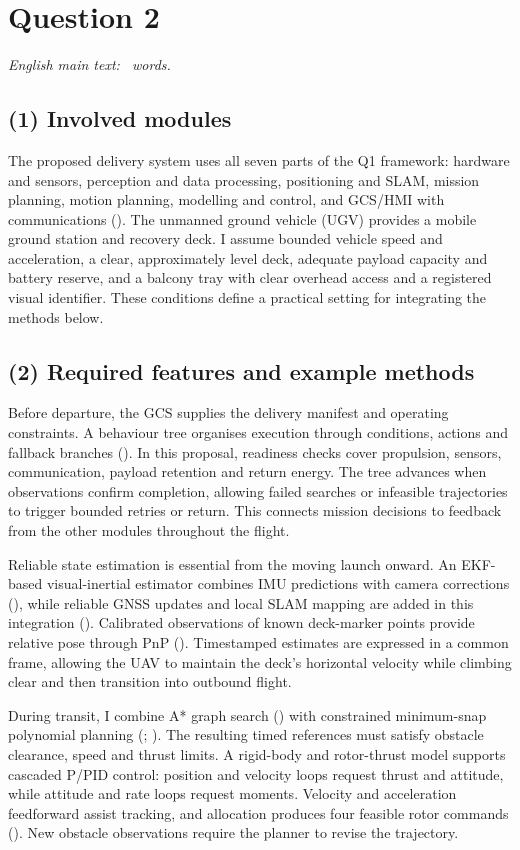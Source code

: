 \section*{Question 2}
\noindent\textit{English main text: \QtwoWords\ words.}
\subsection*{(1) Involved modules}
The proposed delivery system uses all seven parts of the Q1 framework: hardware and sensors, perception and data processing, positioning and SLAM, mission planning, motion planning, modelling and control, and GCS/HMI with communications (\citealp[p. 21]{Chen2022}). The unmanned ground vehicle (UGV) provides a mobile ground station and recovery deck. I assume bounded vehicle speed and acceleration, a clear, approximately level deck, adequate payload capacity and battery reserve, and a balcony tray with clear overhead access and a registered visual identifier. These conditions define a practical setting for integrating the methods below.

\subsection*{(2) Required features and example methods}
Before departure, the GCS supplies the delivery manifest and operating constraints. A behaviour tree organises execution through conditions, actions and fallback branches (\citealp{Colledanchise2018}). In this proposal, readiness checks cover propulsion, sensors, communication, payload retention and return energy. The tree advances when observations confirm completion, allowing failed searches or infeasible trajectories to trigger bounded retries or return. This connects mission decisions to feedback from the other modules throughout the flight.

Reliable state estimation is essential from the moving launch onward. An EKF-based visual-inertial estimator combines IMU predictions with camera corrections (\citealp{Mourikis2007}), while reliable GNSS updates and local SLAM mapping are added in this integration (\citealp{Cadena2016}). Calibrated observations of known deck-marker points provide relative pose through PnP (\citealp{Lepetit2009}). Timestamped estimates are expressed in a common frame, allowing the UAV to maintain the deck's horizontal velocity while climbing clear and then transition into outbound flight.

During transit, I combine A* graph search (\citealp{Hart1968}) with constrained minimum-snap polynomial planning (\citealp{Mellinger2011}; \citealp{Richter2016}). The resulting timed references must satisfy obstacle clearance, speed and thrust limits. A rigid-body and rotor-thrust model supports cascaded P/PID control: position and velocity loops request thrust and attitude, while attitude and rate loops request moments. Velocity and acceleration feedforward assist tracking, and allocation produces four feasible rotor commands (\citealp{PX4}). New obstacle observations require the planner to revise the trajectory.

